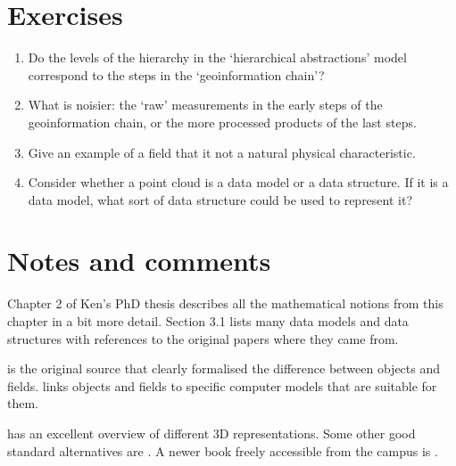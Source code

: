 %
\section{Exercises}

\begin{enumerate}
  \item Do the levels of the hierarchy in the `hierarchical abstractions' model correspond to the steps in the `geoinformation chain'?
	\item What is noisier: the `raw' measurements in the early steps of the geoinformation chain, or the more processed products of the last steps.
	\item Give an example of a field that it not a natural physical characteristic.
	\item Consider whether a point cloud is a data model or a data structure. If it is a data model, what sort of data structure could be used to represent it?
\end{enumerate}



%
\section{Notes and comments}


Chapter 2 of Ken's PhD thesis describes all the mathematical notions from this chapter in a bit more detail.
Section 3.1 lists many data models and data structures with references to the original papers where they came from.

\citet{Couclelis92} is the original source that clearly formalised the difference between objects and fields.
\citet{Goodchild92} links objects and fields to specific computer models that are suitable for them.

\citet{Mantyla88} has an excellent overview of different 3D representations.
Some other good standard alternatives are \citet{Requicha80,Hoffmann92,Foley95}.
A newer book freely accessible from the campus is \citet{Salomon11}.

